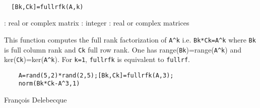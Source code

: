 \begin{mandesc}
   \\ %
\end{mandesc}
\begin{calling_sequence}
\begin{verbatim}
  [Bk,Ck]=fullrfk(A,k)  
\end{verbatim}
\end{calling_sequence}
\begin{parameters}
  \begin{varlist}
    : real or complex matrix
    : integer
    : real or complex matrices
  \end{varlist}
\end{parameters}
\begin{mandescription}
  This function computes the full rank factorization of \verb!A^k! i.e.
  \verb!Bk*Ck=A^k! where \verb!Bk! is full column rank and \verb!Ck! full row rank.
  One has range(\verb!Bk!)=range(\verb!A^k!) and ker(\verb!Ck!)=ker(\verb!A^k!).
  For \verb!k=1!, \verb!fullrfk! is equivalent to \verb!fullrf!.
\end{mandescription}
\begin{examples}
  \begin{Verbatim}
    A=rand(5,2)*rand(2,5);[Bk,Ck]=fullrfk(A,3);
    norm(Bk*Ck-A^3,1)
  \end{Verbatim}
\end{examples}
\begin{manseealso}
     
\end{manseealso}
\begin{authors}
  Fran\c{c}ois Delebecque
\end{authors}
